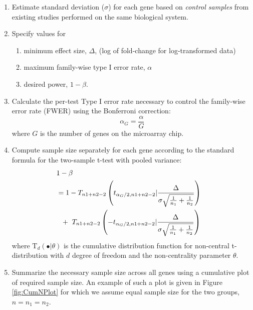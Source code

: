 \documentclass{bioinfo}
\begin{document}
\begin{enumerate}
\item{Estimate standard deviation ($\sigma$) for each gene based on
    \emph{control samples} from existing studies performed on the
    same biological system.}

\item{Specify values for
    \begin{enumerate}
    \item minimum effect size, $\Delta$, (log of fold-change for log-transformed data)
    \item maximum family-wise type I error rate, $\alpha$
    \item desired power, $1 - \beta$.
    \end{enumerate}
  }

\item{Calculate the per-test Type I error rate necessary to control
    the family-wise error rate (FWER) using the Bonferroni correction:}
\begin{equation}
  \alpha_G = \frac{\alpha}{G}
\end{equation}
%
where $G$ is the number of genes on the microarray chip.

\item{Compute sample size separately for each gene according to the
    standard formula for the two-sample t-test with pooled variance:}
  \begin{eqnarray}
    \lefteqn{1-\beta} \nonumber \\
    &= 1-T_{n1+n2-2} \left( t_{\alpha_G/2,n1+n2-2} | \frac{\Delta}{\sigma \sqrt{\frac{1}{n_1} + \frac{1}{n_2}}}\right) \nonumber \\
    &  ~~+~T_{n1+n2-2} \left( -t_{\alpha_G/2,n1+n2-2} | \frac{\Delta}{\sigma \sqrt{\frac{1}{n_1} + \frac{1}{n_2}}}\right)
    \label{eq:formula}
  \end{eqnarray}
  where $\mathrm{T}_{d}(\bullet|\theta)$ is the cumulative
  distribution function for non-central t-distribution with $d$ degree
  of freedom and the non-centrality parameter $\theta$.

\item{Summarize the necessary sample size across all genes using a
      cumulative plot of required sample size. An example of such a
      plot is given in Figure \ref{fig:CumNPlot} for which we assume equal sample size for the two groups, $n = n_1 = n_2$.}

\end{enumerate}
\end{document}
